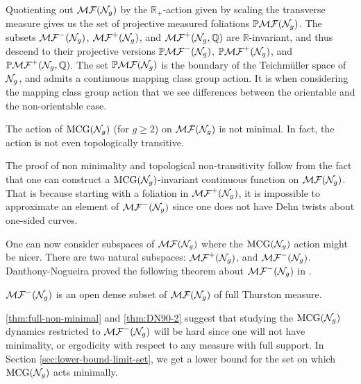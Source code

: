 \documentclass[12pt, reqno]{amsart}
\begin{document}
Quotienting out $\mathcal{MF}(\mathcal{N}_g)$ by the $\mathbb{R_+}$-action given by scaling the transverse measure gives us the set of projective measured foliations $\mathbb{P}\mathcal{MF}(\mathcal{N}_g)$.
The subsets $\mathcal{MF}^-(\mathcal{N}_g)$, $\mathcal{MF}^+(\mathcal{N}_g)$, and $\mathcal{MF}^+(\mathcal{N}_g, \mathbb{Q})$ are $\mathbb{R}$-invariant, and thus descend to their projective versions $\mathbb{P}\mathcal{MF}^-(\mathcal{N}_g)$, $\mathbb{P}\mathcal{MF}^+(\mathcal{N}_g)$, and $\mathbb{P}\mathcal{MF}^+(\mathcal{N}_g, \mathbb{Q})$.
The set $\mathbb{P}\mathcal{MF}(\mathcal{N}_g)$ is the boundary of the Teichm\"uller space of $\mathcal{N}_g$, and admits a continuous mapping class group action.
It is when considering the mapping class group action that we see differences between the orientable and the non-orientable case.

\begin{theorem}
  \label{thm:full-non-minimal}
  The action of $\mathrm{MCG}(\mathcal{N}_g)$ (for $g \geq 2$) on $\mathcal{MF}(\mathcal{N}_g)$ is not minimal.
  In fact, the action is not even topologically transitive.
\end{theorem}
\begin{remark}
  The proof of non minimality and topological non-transitivity follow from the fact that one can construct a $\mathrm{MCG}(\mathcal{N}_g)$-invariant continuous function on $\mathcal{MF}(\mathcal{N}_g)$.
  That is because starting with a foliation in $\mathcal{MF}^+(\mathcal{N}_g)$, it is impossible to approximate an element of $\mathcal{MF}^-(\mathcal{N}_g)$ since one does not have Dehn twists about one-sided curves.
\end{remark}

One can now consider subspaces of $\mathcal{MF}(\mathcal{N}_g)$ where the $\mathrm{MCG}(\mathcal{N}_g)$ action might be nicer. There are two natural subspaces: $\mathcal{MF}^+(\mathcal{N}_g)$, and $\mathcal{MF}^{-}(\mathcal{N}_g)$.
Danthony-Nogueira proved the following theorem about $\mathcal{MF}^{-}(\mathcal{N}_g)$ in \cite{ASENS_1990_4_23_3_469_0}.

\begin{theorem}
  \label{thm:DN90-2}
  $\mathcal{MF}^{-}(\mathcal{N}_g)$ is an open dense subset of $\mathcal{MF}(\mathcal{N}_g)$ of full Thurston measure.
\end{theorem}

\autoref{thm:full-non-minimal} and \autoref{thm:DN90-2} suggest that studying the $\mathrm{MCG}(\mathcal{N}_g)$ dynamics restricted to $\mathcal{MF}^{-}(\mathcal{N}_g)$ will be hard since one will not have minimality, or ergodicity with respect to any measure with full support.
In Section \ref{sec:lower-bound-limit-set}, we get a lower bound for the set on which $\mathrm{MCG}(\mathcal{N}_g)$ acts minimally.
\end{document}
